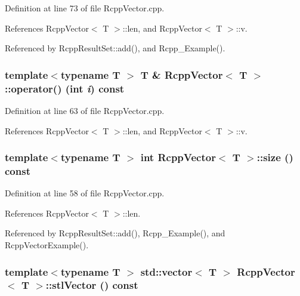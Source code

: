 Definition at line 73 of file RcppVector.cpp.

References RcppVector$<$ T $>$::len, and RcppVector$<$ T $>$::v.

Referenced by RcppResultSet::add(), and Rcpp\_\-Example().\hypertarget{classRcppVector_ad68c84b52ed7bfcd6c71fe1f2ef92010}{
\subsubsection[{operator()}]{\setlength{\rightskip}{0pt plus 5cm}template$<$typename T $>$ T \& {\bf RcppVector}$<$ T $>$::operator() (int {\em i}) const}}
\label{classRcppVector_ad68c84b52ed7bfcd6c71fe1f2ef92010}


Definition at line 63 of file RcppVector.cpp.

References RcppVector$<$ T $>$::len, and RcppVector$<$ T $>$::v.\hypertarget{classRcppVector_abf02690969a4dfcb8c1abedd7f36814f}{
\subsubsection[{size}]{\setlength{\rightskip}{0pt plus 5cm}template$<$typename T $>$ int {\bf RcppVector}$<$ T $>$::size () const}}
\label{classRcppVector_abf02690969a4dfcb8c1abedd7f36814f}


Definition at line 58 of file RcppVector.cpp.

References RcppVector$<$ T $>$::len.

Referenced by RcppResultSet::add(), Rcpp\_\-Example(), and RcppVectorExample().\hypertarget{classRcppVector_af40d2a7f0132330eb8c15ea4e42f4aa9}{
\subsubsection[{stlVector}]{\setlength{\rightskip}{0pt plus 5cm}template$<$typename T $>$ std::vector$<$ T $>$ {\bf RcppVector}$<$ T $>$::stlVector () const}}
\label{classRcppVector_af40d2a7f0132330eb8c15ea4e42f4aa9}


